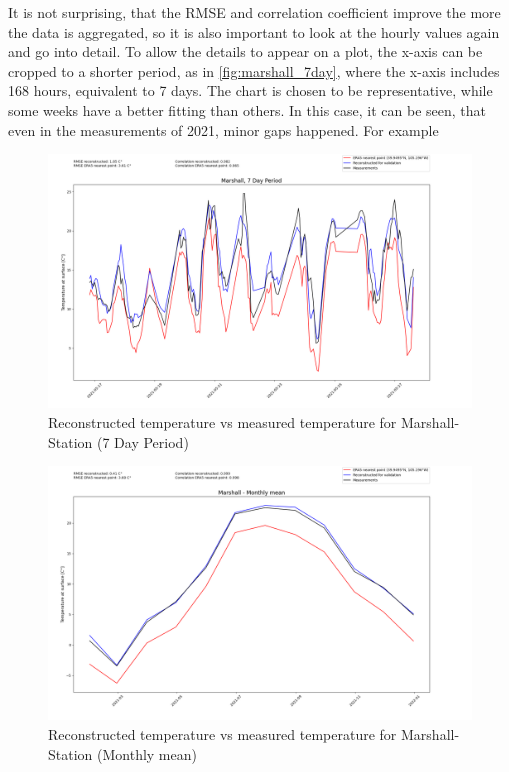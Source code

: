 It is not surprising, that the RMSE and correlation coefficient improve the more the data is aggregated, so it is also important to look at the hourly values again and go into detail. To allow the details to appear on a plot, the x-axis can be cropped to a shorter period, as in \autoref{fig:marshall_7day}, where the x-axis includes 168 hours, equivalent to 7 days. The chart is chosen to be representative, while some weeks have a better fitting than others. In this case, it can be seen, that even in the measurements of 2021, minor gaps happened. For example  


\begin{figure}
    \centering
    \includegraphics[width=\textwidth]{resources/images/charts/marshall_eval_grib_final/Marshall, 7 Day Period_1_2_3.png}
    \caption{Reconstructed temperature vs measured temperature for Marshall-Station (7 Day Period)}
    \label{fig:marshall_7day}
\end{figure}

\begin{figure}
    \centering
    \includegraphics[width=\textwidth]{resources/images/charts/marshall_eval_grib_final/Marshall - Monthly mean.png}
    \caption{Reconstructed temperature vs measured temperature for Marshall-Station (Monthly mean)}
\end{figure}


